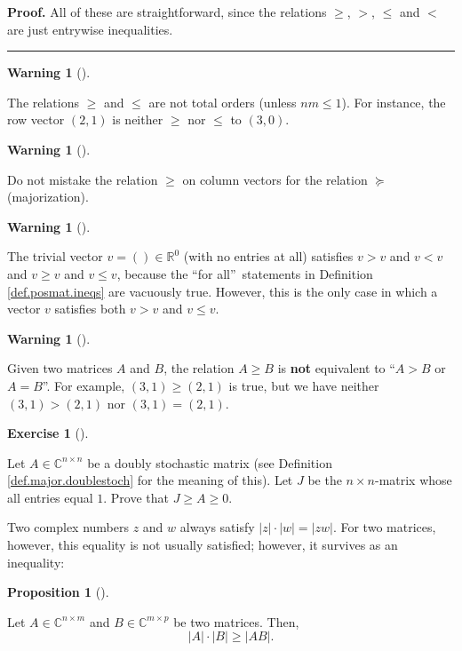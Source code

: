 \documentclass[numbers=enddot,12pt,final,onecolumn,notitlepage]{scrartcl}%
\newcounter{exer}
\numberwithin{exer}{subsection}
\theoremstyle{definition}
\newtheorem{prop}[theo]{Proposition}
\newenvironment{proposition}[1][]
{\begin{prop}[#1]\begin{leftbar}}
{\end{leftbar}\end{prop}}
\newtheorem{warn}[theo]{Warning}
\newenvironment{warning}[1][]
{\begin{warn}[#1]\begin{leftbar}}
{\end{leftbar}\end{warn}}
\newtheorem{exmp}[exer]{Exercise}
\newenvironment{exercise}[1][]
{\begin{exmp}[#1]\begin{leftbar}}
{\end{leftbar}\end{exmp}}
\newenvironment{proof}[1][Proof]{\noindent\textbf{#1.} }{\ \rule{0.5em}{0.5em}}
\newenvironment{warning}[1][Warning]{\noindent\textbf{#1.} }{\ \rule{0.5em}{0.5em}}
\begin{document}
\begin{proof}
All of these are straightforward, since the relations $\geq$, $>$, $\leq$ and
$<$ are just entrywise inequalities.
\end{proof}

\begin{warning}
The relations $\geq$ and $\leq$ are not total orders (unless $nm\leq1$). For
instance, the row vector $\left(  2,1\right)  $ is neither $\geq$ nor $\leq$
to $\left(  3,0\right)  $.
\end{warning}

\begin{warning}
Do not mistake the relation $\geq$ on column vectors for the relation
$\succcurlyeq$ (majorization).
\end{warning}

\begin{warning}
The trivial vector $v=\left(  {}\right)  \in\mathbb{R}^{0}$ (with no entries
at all) satisfies $v>v$ and $v<v$ and $v\geq v$ and $v\leq v$, because the
\textquotedblleft for all\textquotedblright\ statements in Definition
\ref{def.posmat.ineqs} are vacuously true. However, this is the only case in
which a vector $v$ satisfies both $v>v$ and $v\leq v$.
\end{warning}

\begin{warning}
Given two matrices $A$ and $B$, the relation $A\geq B$ is \textbf{not}
equivalent to \textquotedblleft$A>B$ or $A=B$\textquotedblright. For example,
$\left(  3,1\right)  \geq\left(  2,1\right)  $ is true, but we have neither
$\left(  3,1\right)  >\left(  2,1\right)  $ nor $\left(  3,1\right)  =\left(
2,1\right)  $.
\end{warning}

\begin{exercise}
 Let $A\in\mathbb{C}^{n\times n}$ be a doubly stochastic matrix (see
Definition \ref{def.major.doublestoch} for the meaning of this). Let $J$ be
the $n\times n$-matrix whose all entries equal $1$. Prove that $J\geq A\geq0$.
\end{exercise}

Two complex numbers $z$ and $w$ always satisfy $\left\vert z\right\vert
\cdot\left\vert w\right\vert =\left\vert zw\right\vert $. For two matrices,
however, this equality is not usually satisfied; however, it survives as an inequality:

\begin{proposition}
\label{prop.posmat.prod-geq}Let $A\in\mathbb{C}^{n\times m}$ and
$B\in\mathbb{C}^{m\times p}$ be two matrices. Then,%
\[
\left\vert A\right\vert \cdot\left\vert B\right\vert \geq\left\vert
AB\right\vert .
\]

\end{proposition}
\end{document}
